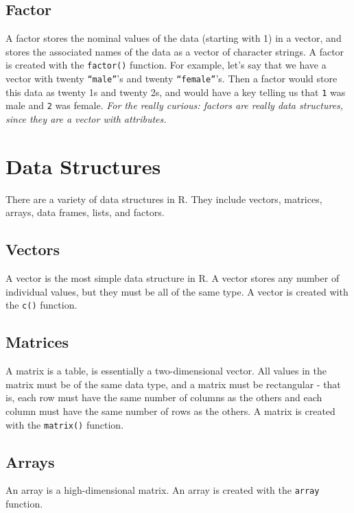 \documentclass[11pt,letterpaper,fleqn]{report}
\begin{document}
\subsection{Factor}
A factor stores the nominal values of the data (starting with 1) in a vector, and stores the associated names of the data as a vector of character strings. A factor is created with the \texttt{factor()} function. For example, let's say that we have a vector with twenty \texttt{``male''}'s and twenty \texttt{``female''}'s. Then a factor would store this data as twenty 1s and twenty 2s, and would have a key telling us that \texttt{1} was male and \texttt{2} was female. \emph{For the really curious: factors are really data structures, since they are a vector with attributes.}

\section{Data Structures}
There are a variety of data structures in R. They include vectors, matrices, arrays, data frames, lists, and factors.

\subsection{Vectors}
A vector is the most simple data structure in R. A vector stores any number of individual values, but they must be all of the same type. A vector is created with the \texttt{c()} function.

\subsection{Matrices}
A matrix is a table, is essentially a two-dimensional vector. All values in the matrix must be of the same data type, and a matrix must be rectangular - that is, each row must have the same number of columns as the others and each column must have the same number of rows as the others. A matrix is created with the \texttt{matrix()} function. 

\subsection{Arrays}
An array is a high-dimensional matrix. An array is created with the \texttt{array} function.
\end{document}
